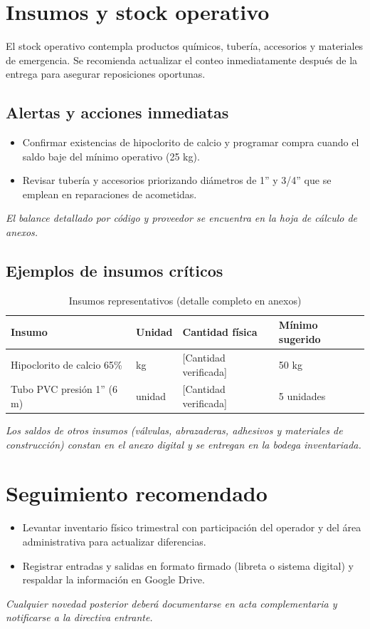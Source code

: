 \section{Insumos y stock operativo}

El stock operativo contempla productos químicos, tubería, accesorios y materiales de emergencia. Se recomienda actualizar el conteo inmediatamente después de la entrega para asegurar reposiciones oportunas.

\subsection*{Alertas y acciones inmediatas}
\begin{itemize}[noitemsep, topsep=0pt]
  \item Confirmar existencias de hipoclorito de calcio y programar compra cuando el saldo baje del mínimo operativo (25 kg).
  \item Revisar tubería y accesorios priorizando diámetros de 1'' y 3/4'' que se emplean en reparaciones de acometidas.
\end{itemize}
\textit{El balance detallado por código y proveedor se encuentra en la hoja de cálculo de anexos.}

\subsection*{Ejemplos de insumos críticos}
\begin{table}[H]
\centering
\caption{Insumos representativos (detalle completo en anexos)}
\label{tab:insumos_representativos}
\begin{tabular}{p{4.2cm} p{2.6cm} p{3cm} p{3.2cm}}
\toprule
\textbf{Insumo} & \textbf{Unidad} & \textbf{Cantidad física} & \textbf{Mínimo sugerido} \\
\midrule
Hipoclorito de calcio 65\% & kg & [Cantidad verificada] & 50 kg \\
Tubo PVC presión 1'' (6 m) & unidad & [Cantidad verificada] & 5 unidades \\
\bottomrule
\end{tabular}
\end{table}
\textit{Los saldos de otros insumos (válvulas, abrazaderas, adhesivos y materiales de construcción) constan en el anexo digital y se entregan en la bodega inventariada.}

\section{Seguimiento recomendado}

\begin{itemize}[noitemsep, topsep=0pt]
  \item Levantar inventario físico trimestral con participación del operador y del área administrativa para actualizar diferencias.
  \item Registrar entradas y salidas en formato firmado (libreta o sistema digital) y respaldar la información en Google Drive.
\end{itemize}
\textit{Cualquier novedad posterior deberá documentarse en acta complementaria y notificarse a la directiva entrante.}
